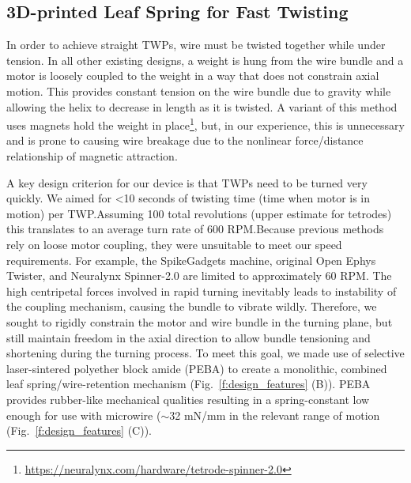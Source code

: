 \documentclass[11pt,a4paper]{article}
\begin{document}
\subsection{3D-printed Leaf Spring for Fast Twisting}
In order to achieve straight TWPs, wire must be twisted together while under
tension. In all other existing designs, a weight is hung from the wire bundle
and a motor is loosely coupled to the weight in a way that does not constrain
axial motion. This provides constant tension on the wire bundle due to gravity
while allowing the helix to decrease in length as it is twisted. A variant of
this method uses magnets hold the weight in
place\footnote{\url{https://neuralynx.com/hardware/tetrode-spinner-2.0}}, but,
in our experience, this is unnecessary and is prone to causing wire breakage
due to the nonlinear force/distance relationship of magnetic attraction.

A key design criterion for our device is that TWPs need to be turned very
quickly. We aimed for <10 seconds of twisting time (time when motor is in
motion) per TWP.\@ Assuming 100 total revolutions (upper estimate for tetrodes)
this translates to an average turn rate of 600 RPM.\@ Because previous methods
rely on loose motor coupling, they were unsuitable to meet our speed
requirements. For example, the SpikeGadgets machine, original Open Ephys
Twister, and Neuralynx Spinner-2.0 are limited to approximately 60 RPM. The
high centripetal forces involved in rapid turning inevitably leads to
instability of the coupling mechanism, causing the bundle to vibrate wildly.
Therefore, we sought to rigidly constrain the motor and wire bundle in the
turning plane, but still maintain freedom in the axial direction to allow
bundle tensioning and shortening during the turning process. To meet this goal,
we made use of selective laser-sintered polyether block amide (PEBA) to create
a monolithic, combined leaf spring/wire-retention mechanism
(Fig.~\ref{f:design_features} (B)). PEBA provides rubber-like mechanical
qualities resulting in a spring-constant low enough for use with microwire
($\sim$32 mN/mm in the relevant range of motion (Fig.~\ref{f:design_features}
(C)).
\end{document}
